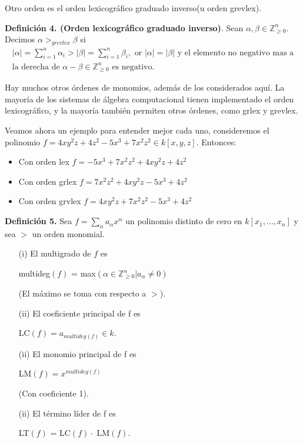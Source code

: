 Otro orden es el orden lexicográfico graduado inverso(u orden grevlex).

\textbf{Definición 4. (Orden lexicográfico graduado inverso)}. Sean $\alpha,\beta \in \mathbb{Z}^{n}_{\geq0}$. Decimos $\alpha >_{grevlex} \beta$ si 
\begin{multline*}
|\alpha| = \sum_{i=1}^{n}\alpha_{i} > |\beta| = \sum_{i=1}^{n}\beta_{i},\mbox{ or } |\alpha| = |\beta| \mbox{ y el elemento no negativo mas a}\\ \mbox{la derecha de } \alpha-\beta\in\mathbb{Z}^{n}_{\geq0}\mbox{ es negativo.}
\end{multline*}

Hay muchos otros órdenes de monomios, además de los considerados aquí. La mayoría de los sistemas de álgebra computacional tienen implementado el orden lexicográfico, y la mayoría también permiten otros órdenes, como grlex y grevlex.

Veamos ahora un ejemplo para entender mejor cada uno, consideremos el polinomio $f = 4xy^{2}z + 4z^{2} - 5x^{3} + 7x^{2}z^{2} \in k[x,y,z]$. Entonces:
\begin{itemize}
	\item Con orden lex    $f = - 5x^{3} + 7x^{2}z^{2} + 4xy^{2}z + 4z^{2}$
	\item Con orden grlex  $f = 7x^{2}z^{2} + 4xy^{2}z - 5x^{3} + 4z^{2}$
	\item Con orden grvlex $f = 4xy^{2}z + 7x^{2}z^{2} - 5x^{3} + 4z^{2}$
\end{itemize}

\textbf{Definición 5.} Sea $f = \sum_{\alpha}a_{\alpha}x^{\alpha}$ un polinomio distinto de cero en $k[x_{1},...,x_{n}]$ y sea $>$ un orden monomial.

\begin{enumerate}
	\item [(i)] El multigrado de $f$ es
	\begin{center}
		multideg$(f)$ = max$(\alpha \in \mathbb{Z}^{n}_{\geq0} | a_{\alpha} \neq 0)$
	\end{center}
	(El máximo se toma con respecto a $>$).
	
	\item [(ii)] El coeficiente principal de f es
	\begin{center}
		LC$(f) = a_{multideg(f)} \in k$.
	\end{center}

	\item [(ii)] El monomio principal de f es
	\begin{center}
		LM$(f) = x^{multideg(f)}$
	\end{center}
	(Con coeficiente 1).
	\item [(ii)] El término líder de f es
	\begin{center}
		LT$(f)$ = LC$(f) \cdot $ LM$(f)$.
	\end{center}
\end{enumerate}

